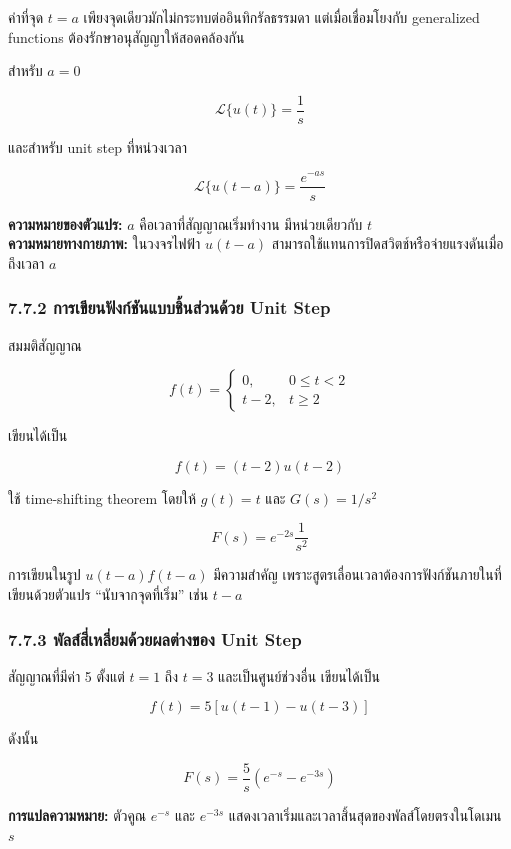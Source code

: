 ค่าที่จุด $t=a$ เพียงจุดเดียวมักไม่กระทบต่ออินทิกรัลธรรมดา แต่เมื่อเชื่อมโยงกับ generalized functions ต้องรักษาอนุสัญญาให้สอดคล้องกัน

สำหรับ $a=0$

\[
\mathcal{L}\{u(t)\}=\frac{1}{s}
\]

และสำหรับ unit step ที่หน่วงเวลา

\[
\boxed{\mathcal{L}\{u(t-a)\}=\frac{e^{-as}}{s}}
\]

\textbf{ความหมายของตัวแปร:} $a$ คือเวลาที่สัญญาณเริ่มทำงาน มีหน่วยเดียวกับ $t$\\
\textbf{ความหมายทางกายภาพ:} ในวงจรไฟฟ้า $u(t-a)$ สามารถใช้แทนการปิดสวิตช์หรือจ่ายแรงดันเมื่อถึงเวลา $a$

\subsubsection{7.7.2 การเขียนฟังก์ชันแบบชิ้นส่วนด้วย Unit Step}

สมมติสัญญาณ

\[
f(t)=
\begin{cases}
0, & 0\le t<2\\
t-2, & t\ge 2
\end{cases}
\]

เขียนได้เป็น

\[
f(t)=(t-2)u(t-2)
\]

ใช้ time-shifting theorem โดยให้ $g(t)=t$ และ $G(s)=1/s^2$

\[
\boxed{F(s)=e^{-2s}\frac{1}{s^2}}
\]

การเขียนในรูป $u(t-a)f(t-a)$ มีความสำคัญ เพราะสูตรเลื่อนเวลาต้องการฟังก์ชันภายในที่เขียนด้วยตัวแปร “นับจากจุดที่เริ่ม” เช่น $t-a$

\subsubsection{7.7.3 พัลส์สี่เหลี่ยมด้วยผลต่างของ Unit Step}

สัญญาณที่มีค่า 5 ตั้งแต่ $t=1$ ถึง $t=3$ และเป็นศูนย์ช่วงอื่น เขียนได้เป็น

\[
f(t)=5[u(t-1)-u(t-3)]
\]

ดังนั้น

\[
\boxed{F(s)=\frac{5}{s}\left(e^{-s}-e^{-3s}\right)}
\]

\textbf{การแปลความหมาย:} ตัวคูณ $e^{-s}$ และ $e^{-3s}$ แสดงเวลาเริ่มและเวลาสิ้นสุดของพัลส์โดยตรงในโดเมน $s$


